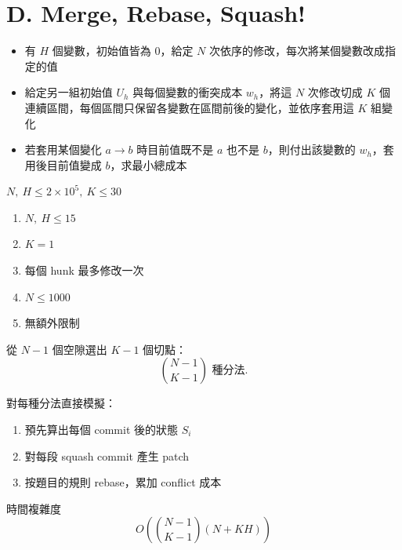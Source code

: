 \section{D. Merge, Rebase, Squash!}

\begin{frame}{}
    \begin{itemize}
        \item{有 $H$ 個變數，初始值皆為 $0$，給定 $N$ 次依序的修改，每次將某個變數改成指定的值}
        \item{給定另一組初始值 $U_h$ 與每個變數的衝突成本 $w_h$，將這 $N$ 次修改切成 $K$ 個連續區間，每個區間只保留各變數在區間前後的變化，並依序套用這 $K$ 組變化}
        \item{若套用某個變化 $a \rightarrow b$ 時目前值既不是 $a$ 也不是 $b$，則付出該變數的 $w_h$，套用後目前值變成 $b$，求最小總成本}
    \end{itemize}

    $N,\ H \le 2 \times 10^5,\ K \le 30$
\end{frame}


\begin{frame}{}
    \begin{enumerate}
        \item{$N,\ H\le 15$}
        \item{$K = 1$}
        \item{每個 hunk 最多修改一次}
        \item{$N \le 1000$}
        \item{無額外限制}
    \end{enumerate}
\end{frame}

\begin{frame}{}
    從 $N-1$ 個空隙選出 $K-1$ 個切點：
    \[
        \binom{N-1}{K-1}\text{ 種分法}.
    \]

    對每種分法直接模擬：
    \begin{enumerate}
        \item 預先算出每個 commit 後的狀態 $S_i$
        \item 對每段 squash commit 產生 patch
        \item 按題目的規則 rebase，累加 conflict 成本
    \end{enumerate}

    時間複雜度
    \[
        O\!\left(\binom{N-1}{K-1}(N+KH)\right)
    \]
\end{frame}

